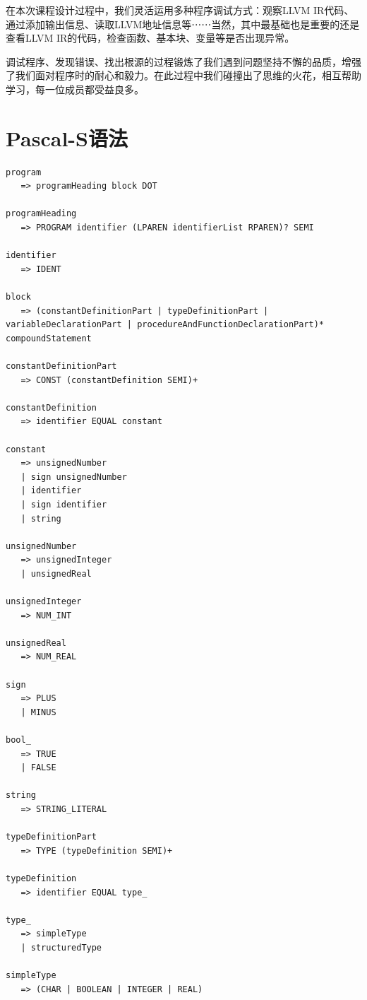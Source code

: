 \documentclass[lang=cn,11pt,a4paper,cite=authornum]{paper}
\begin{document}
在本次课程设计过程中，我们灵活运用多种程序调试方式：观察LLVM IR代码、通过添加输出信息、读取LLVM地址信息等⋯⋯当然，其中最基础也是重要的还是查看LLVM IR的代码，检查函数、基本块、变量等是否出现异常。

调试程序、发现错误、找出根源的过程锻炼了我们遇到问题坚持不懈的品质，增强了我们面对程序时的耐心和毅力。在此过程中我们碰撞出了思维的火花，相互帮助学习，每一位成员都受益良多。

\appendix

\section{Pascal-S语法}

\label{PascalS}

\begin{code}
\begin{verbatim}
program
   => programHeading block DOT
   
programHeading
   => PROGRAM identifier (LPAREN identifierList RPAREN)? SEMI
   
identifier
   => IDENT
   
block
   => (constantDefinitionPart | typeDefinitionPart | variableDeclarationPart | procedureAndFunctionDeclarationPart)* compoundStatement
   
constantDefinitionPart
   => CONST (constantDefinition SEMI)+
   
constantDefinition
   => identifier EQUAL constant
   
constant
   => unsignedNumber         
   | sign unsignedNumber    
   | identifier             
   | sign identifier        
   | string                 
   
unsignedNumber
   => unsignedInteger    
   | unsignedReal       
   
unsignedInteger
   => NUM_INT
   
unsignedReal
   => NUM_REAL
   
sign
   => PLUS   
   | MINUS  
   
bool_
   => TRUE   
   | FALSE  
   
string
   => STRING_LITERAL
   
typeDefinitionPart
   => TYPE (typeDefinition SEMI)+
   
typeDefinition
   => identifier EQUAL type_
   
type_
   => simpleType     
   | structuredType 
   
simpleType
   => (CHAR | BOOLEAN | INTEGER | REAL)
   

\end{verbatim}
\end{code}
\end{document}
